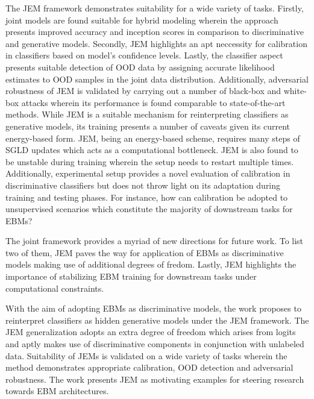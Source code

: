 \documentclass[11pt,letterpaper]{article}
\begin{document}
The JEM framework demonstrates suitability for a wide variety of tasks. Firstly, joint models are found suitable for hybrid modeling wherein the approach presents improved accuracy and inception scores in comparison to discriminative and generative models. Secondly, JEM highlights an apt neccessity for calibration in classifiers based on model's confidence levels. Lastly, the classifier aspect presents suitable detection of OOD data by assigning accurate likelihood estimates to OOD samples in the joint data distribution. Additionally, adversarial robustness of JEM is validated by carrying out a number of black-box and white-box attacks wherein its performance is found comparable to state-of-the-art methods. While JEM is a suitable mechanism for reinterpreting classifiers as generative models, its training presents a number of caveats given its current energy-based form. JEM, being an energy-based scheme, requires many steps of SGLD updates which acts as a computational bottleneck. JEM is also found to be unstable during training wherein the setup needs to restart multiple times. Additionally, experimental setup provides a novel evaluation of calibration in discriminative classifiers but does not throw light on its adaptation during training and testing phases. For instance, how can calibration be adopted to unsupervised scenarios which constitute the majority of downstream tasks for EBMs? 

The joint framework provides a myriad of new directions for future work. To list two of them, JEM paves the way for application of EBMs as discriminative models making use of additional degrees of fredom. Lastly, JEM highlights the importance of stabilizing EBM training for downstream tasks under computational constraints. 

With the aim of adopting EBMs as discriminative models, the work proposes to reinterpret classifiers as hidden generative models under the JEM framework. The JEM generalization adopts an extra degree of freedom which arises from logits and aptly makes use of discriminative components in conjunction with unlabeled data. Suitability of JEMs is validated on a wide variety of tasks wherein the method demonstrates appropriate calibration, OOD detection and adversarial robustness. The work presents JEM as motivating examples for steering research towards EBM architectures. 
\end{document}
